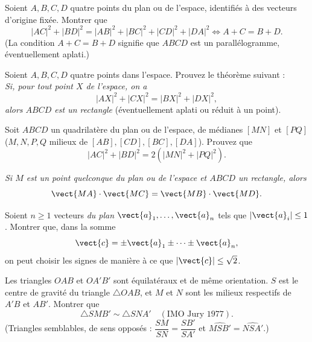\begin{problem}
Soient $A, B, C, D$ quatre points du plan ou de l'espace, identifiés à des vecteurs d'origine fixée. Montrer que
\[
|AC|^2 + |BD|^2 = |AB|^2 + |BC|^2 + |CD|^2 + |DA|^2 \Longleftrightarrow A + C = B + D.
\]
(La condition $A+C=B+D$ signifie que $ABCD$ est un parallélogramme, éventuellement aplati.)
\end{problem}

\begin{problem}
Soient \( A, B, C, D \) quatre points dans l’espace. Prouvez le théorème suivant :\\
\textit{Si, pour tout point \( X \) de l’espace, on a}
\[
|AX|^2 + |CX|^2 = |BX|^2 + |DX|^2,
\]
\textit{alors \( ABCD \) est un rectangle} (éventuellement aplati ou réduit à un point).
\end{problem}

\begin{problem}
Soit $ABCD$ un quadrilatère du plan ou de l'espace, de médianes $[MN]$ et $[PQ]$ ($M, N, P, Q$ milieux de $[AB], [CD], [BC], [DA]$). Prouvez que
\[
|AC|^2 + |BD|^2 = 2 \left( |MN|^2 + |PQ|^2 \right).
\]
\end{problem}

\begin{problem}
\textit{Si \( M \) est un point quelconque du plan ou de l'espace et \( ABCD \) un rectangle, alors}
\[
\vect{MA} \cdot \vect{MC} = \vect{MB} \cdot \vect{MD}.
\]
\end{problem}

\begin{problem}
Soient \( n \geq 1 \) vecteurs \emph{du plan} \( \vect{a}_1, \ldots, \vect{a}_n \) tels que \( |\vect{a}_i| \leq 1 \). Montrer que, dans la somme
\[
\vect{c} = \pm \vect{a}_1 \pm \cdots \pm \vect{a}_n,
\]
on peut choisir les signes de manière à ce que \( |\vect{c}| \leq \sqrt{2} \).
\end{problem}

\begin{problem}
Les triangles \( OAB \) et \( OA'B' \) sont équilatéraux et de même orientation. \( S \) est le centre de gravité du triangle \( \triangle OAB \), et \( M \) et \( N \) sont les milieux respectifs de \( A'B \) et \( AB' \). Montrer que
\[
\triangle SMB' \sim \triangle SNA' \quad (\text{IMO Jury 1977}).
\]
(Triangles semblables, de sens opposés : $\dfrac{SM}{SN}=\dfrac{SB'}{SA'}$ et $\widehat{MSB'}=\widehat{NSA'}$.)
\end{problem}


